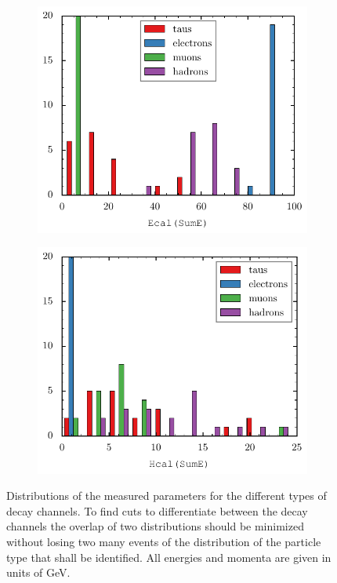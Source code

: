 \documentclass[11pt, a4paper]{article}
\numberwithin{equation}{section}
\begin{document}
\begin{figure}[htb]
\begin{subfigure}{.5\textwidth}
	\end{subfigure}
	\begin{subfigure}{.5\textwidth}
		\centering
		\includegraphics[width=\textwidth]{./figures/event_display/Ecal(SumE)}

	\end{subfigure}
	\begin{subfigure}{.5\textwidth}
		\centering
		\includegraphics[width=\textwidth]{./figures/event_display/Hcal(SumE)}

	\end{subfigure}
	\caption{Distributions of the measured parameters for the different types of decay channels. To find cuts to differentiate between the decay channels the overlap of two distributions should be minimized without losing two many events of the distribution of the particle type that shall be identified. All energies and momenta are given in units of \si{GeV}.}
	\label{fig:histograms}
\end{figure}
\end{document}
